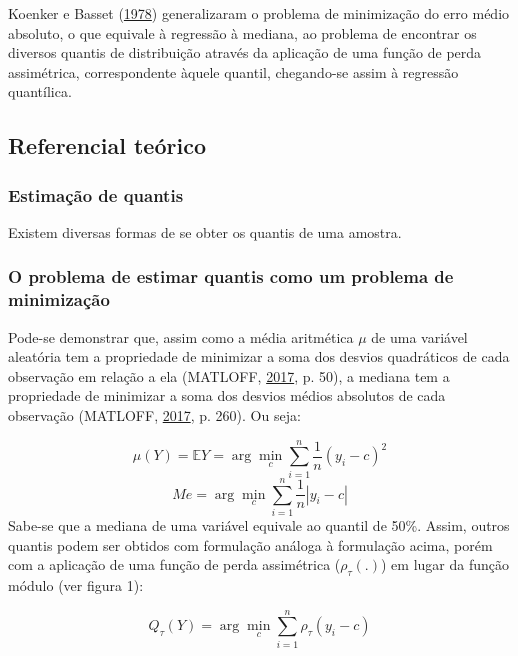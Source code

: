 \documentclass[a4paper, 12pt]{article}
\begin{document}
Koenker e Basset (\protect\hyperlink{ref-koenker1978}{1978})
generalizaram o problema de minimização do erro médio absoluto, o que
equivale à regressão à mediana, ao problema de encontrar os diversos
quantis de distribuição através da aplicação de uma função de perda
assimétrica, correspondente àquele quantil, chegando-se assim à
regressão quantílica.

\hypertarget{referencial-teorico}{%
\subsection{Referencial teórico}\label{referencial-teorico}}

\hypertarget{estimacao-de-quantis}{%
\subsubsection{Estimação de quantis}\label{estimacao-de-quantis}}

Existem diversas formas de se obter os quantis de uma amostra.

\hypertarget{o-problema-de-estimar-quantis-como-um-problema-de-minimizacao}{%
\subsubsection{O problema de estimar quantis como um problema de
minimização}\label{o-problema-de-estimar-quantis-como-um-problema-de-minimizacao}}

Pode-se demonstrar que, assim como a média aritmética \(\mu\) de uma
variável aleatória tem a propriedade de minimizar a soma dos desvios
quadráticos de cada observação em relação a ela (MATLOFF,
\protect\hyperlink{ref-matloff2017}{2017}, p. 50), a mediana tem a
propriedade de minimizar a soma dos desvios médios absolutos de cada
observação (MATLOFF, \protect\hyperlink{ref-matloff2017}{2017}, p. 260).
Ou seja:

\[\mu(Y) = \mathbb{E}Y = \arg \min_c \sum_{i = 1}^n \frac{1}{n}(y_i - c)^2\]
\[Me = \arg \min_c \sum_{i = 1}^n \frac{1}{n}|y_i - c|\] Sabe-se que a
mediana de uma variável equivale ao quantil de 50\%. Assim, outros
quantis podem ser obtidos com formulação análoga à formulação acima,
porém com a aplicação de uma função de perda assimétrica
(\(\rho_\tau(.)\)) em lugar da função módulo (ver figura 1):

\[Q_\tau(Y) = \arg \min_c \sum_{i = 1}^n \rho_\tau(y_i - c)\]
\end{document}
